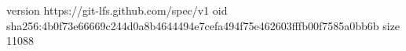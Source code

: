version https://git-lfs.github.com/spec/v1
oid sha256:4b0f73e66669c244d0a8b4644494e7cefa494f75e462603fffb00f7585a0bb6b
size 11088
